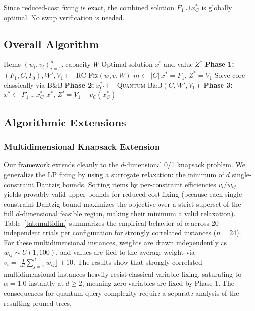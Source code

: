 \documentclass[conference]{IEEEtran} \IEEEoverridecommandlockouts
\begin{document}
Since reduced-cost fixing is exact, the combined solution $F_1 \cup x^*_C$ is globally optimal. No swap verification is needed.

\subsection{Overall Algorithm}

\begin{algorithm}[h]
\caption{LP-Pruned Quantum B\&B Knapsack Solver}
\label{alg:hybrid}
\begin{algorithmic}[1]
\REQUIRE Items $(w_i, v_i)_{i=1}^n$, capacity $W$
\ENSURE Optimal solution $x^*$ and value $Z^*$
\STATE \textbf{Phase 1:} $(F_1, C, F_0), W', V_1 \leftarrow$ \textsc{RC-Fix}$(w, v, W)$ 
\STATE $m \leftarrow |C|$
    \RETURN $x^* = F_1$, $Z^* = V_1$
    \STATE Solve core classically via B\&B
\ELSE
    \STATE \textbf{Phase 2:} $x^*_C \leftarrow$ \textsc{Quantum-B\&B}$(C, W', V_1)$ 
\ENDIF
\STATE \textbf{Phase 3:} $x^* \leftarrow F_1 \cup x^*_C$
\RETURN $x^*$, $Z^* = V_1 + v_C(x^*_C)$
\end{algorithmic}
\end{algorithm}

\subsection{Algorithmic Extensions}



\subsubsection{Multidimensional Knapsack Extension}
Our framework extends cleanly to the $d$-dimensional 0/1 knapsack problem. We generalize the LP fixing by using a surrogate relaxation: the minimum of $d$ single-constraint Dantzig bounds. Sorting items by per-constraint efficiencies $v_i/w_{ij}$ yields provably valid upper bounds for reduced-cost fixing (because each single-constraint Dantzig bound maximizes the objective over a strict superset of the full $d$-dimensional feasible region, making their minimum a valid relaxation). Table~\ref{tab:multidim} summarizes the empirical behavior of $\alpha$ across 20 independent trials per configuration for strongly correlated instances ($n=24$). For these multidimensional instances, weights are drawn independently as $w_{ij} \sim U(1, 100)$, and values are tied to the average weight via $v_i = \lfloor \frac{1}{d} \sum_{j=1}^d w_{ij} \rfloor + 10$. The results show that strongly correlated multidimensional instances heavily resist classical variable fixing, saturating to $\alpha = 1.0$ instantly at $d \ge 2$, meaning zero variables are fixed by Phase 1. The consequences for quantum query complexity require a separate analysis of the resulting pruned trees.
\end{document}

